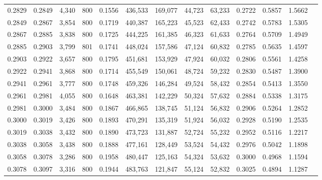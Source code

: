 \begin{tabular}{rrrrrrrrrrrrr}
0.2829 & 0.2849 &  4,340 &   800 &                                     0.1556 & 436,533 & 169,077 &  44,723 &  63,233 & 0.2722 & 0.5857 & 1.5662 \\
0.2849 & 0.2867 &  3,854 &   800 &                                     0.1719 & 440,387 & 165,223 &  45,523 &  62,433 & 0.2742 & 0.5783 & 1.5305 \\
0.2867 & 0.2885 &  3,838 &   800 &                                     0.1725 & 444,225 & 161,385 &  46,323 &  61,633 & 0.2764 & 0.5709 & 1.4949 \\
0.2885 & 0.2903 &  3,799 &   801 &                                     0.1741 & 448,024 & 157,586 &  47,124 &  60,832 & 0.2785 & 0.5635 & 1.4597 \\
0.2903 & 0.2922 &  3,657 &   800 &                                     0.1795 & 451,681 & 153,929 &  47,924 &  60,032 & 0.2806 & 0.5561 & 1.4258 \\
0.2922 & 0.2941 &  3,868 &   800 &                                     0.1714 & 455,549 & 150,061 &  48,724 &  59,232 & 0.2830 & 0.5487 & 1.3900 \\
0.2941 & 0.2961 &  3,777 &   800 &                                     0.1748 & 459,326 & 146,284 &  49,524 &  58,432 & 0.2854 & 0.5413 & 1.3550 \\
0.2961 & 0.2981 &  4,055 &   800 &                                     0.1648 & 463,381 & 142,229 &  50,324 &  57,632 & 0.2884 & 0.5338 & 1.3175 \\
0.2981 & 0.3000 &  3,484 &   800 &                                     0.1867 & 466,865 & 138,745 &  51,124 &  56,832 & 0.2906 & 0.5264 & 1.2852 \\
0.3000 & 0.3019 &  3,426 &   800 &                                     0.1893 & 470,291 & 135,319 &  51,924 &  56,032 & 0.2928 & 0.5190 & 1.2535 \\
0.3019 & 0.3038 &  3,432 &   800 &                                     0.1890 & 473,723 & 131,887 &  52,724 &  55,232 & 0.2952 & 0.5116 & 1.2217 \\
0.3038 & 0.3058 &  3,438 &   800 &                                     0.1888 & 477,161 & 128,449 &  53,524 &  54,432 & 0.2976 & 0.5042 & 1.1898 \\
0.3058 & 0.3078 &  3,286 &   800 &                                     0.1958 & 480,447 & 125,163 &  54,324 &  53,632 & 0.3000 & 0.4968 & 1.1594 \\
0.3078 & 0.3097 &  3,316 &   800 &                                     0.1944 & 483,763 & 121,847 &  55,124 &  52,832 & 0.3025 & 0.4894 & 1.1287 \\

\end{tabular}
